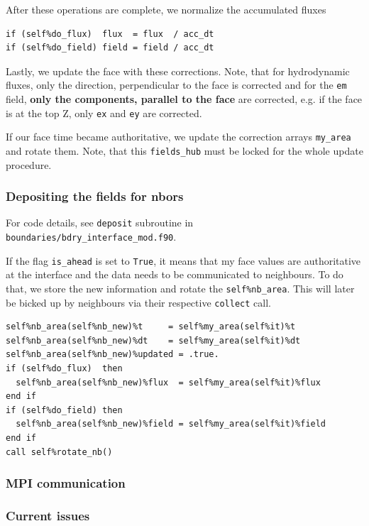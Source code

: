 \documentclass[paper=a4,fontsize=11pt]{scrartcl}
\numberwithin{equation}{section}		%
\numberwithin{figure}{section}			%
\numberwithin{table}{section}				%
\newcommand{\codecolor}{\color{Blue}}
\newcommand{\filecolor}{\color{NavyBlue}}
\newcommand{\File}[1]{{\filecolor\texttt{#1}}}
\newcommand{\Code}[1]{{\codecolor\texttt{#1}}}
\begin{document}
After these operations are complete, we normalize the accumulated fluxes
{\codecolor\begin{verbatim}
if (self%do_flux)  flux  = flux  / acc_dt
if (self%do_field) field = field / acc_dt  
\end{verbatim}}

Lastly, we update the face with these corrections. Note, that for hydrodynamic fluxes, only the direction, perpendicular to the face is corrected and for the \Code{em} field, \textbf{only the components, parallel to the face} are corrected, e.g. if the face is at the top Z, only \Code{ex} and \Code{ey} are corrected.

If our face time became authoritative, we update the correction arrays \Code{my\_area} and rotate them. Note, that this \Code{fields\_hub} must be locked for the whole update procedure.

\subsubsection{Depositing the fields for nbors}
For code details, see \Code{deposit} subroutine in \File{boundaries/bdry\_interface\_mod.f90}.

If the flag \Code{is\_ahead} is set to \Code{True}, it means that my face values are authoritative at the interface and the data needs to be communicated to neighbours. To do that, we store the new information and rotate the \Code{self\%nb\_area}. This will later be bicked up by neighbours via their respective \Code{collect} call.
{\codecolor\begin{verbatim}
self%nb_area(self%nb_new)%t     = self%my_area(self%it)%t
self%nb_area(self%nb_new)%dt    = self%my_area(self%it)%dt
self%nb_area(self%nb_new)%updated = .true.
if (self%do_flux)  then
  self%nb_area(self%nb_new)%flux  = self%my_area(self%it)%flux
end if
if (self%do_field) then
  self%nb_area(self%nb_new)%field = self%my_area(self%it)%field
end if
call self%rotate_nb() 
\end{verbatim}}

\subsubsection{MPI communication}

\subsubsection{Current issues}
\end{document}
